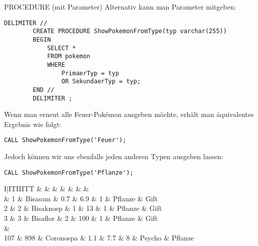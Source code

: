 \begin{sql}{PROCEDURE (mit Parameter)}
    Alternativ kann man Parameter mitgeben:

    \begin{lstlisting}[language=mysql]
        DELIMITER //
        CREATE PROCEDURE ShowPokemonFromType(typ varchar(255))
        BEGIN
            SELECT *
            FROM pokemon
            WHERE
                PrimaerTyp = typ
                OR SekundaerTyp = typ;
        END //
        DELIMITER ;
    \end{lstlisting}

    Wenn man erneut alle Feuer-Pokémon ausgeben möchte, erhält man äquivalentes Ergebnis wie folgt:

    \begin{lstlisting}[language=mysql]
        CALL ShowPokemonFromType('Feuer');
    \end{lstlisting}

    Jedoch können wir uns ebenfalls jeden anderen Typen ausgeben lassen:

    \begin{lstlisting}[language=mysql]
        CALL ShowPokemonFromType('Pflanze');
    \end{lstlisting}

    \begin{tabular}{I|ITIIITT}
                                   &     &  &  &  &  &  &  \\                          & 1                         & Bisasam                  & 0.7                         & 6.9                         & 1                              & Pflanze                        & Gift                             \\
        2                          & 2                         & Bisaknosp                & 1                           & 13                          & 1                              & Pflanze                        & Gift                             \\
        3                          & 3                         & Bisaflor                 & 2                           & 100                         & 1                              & Pflanze                        & Gift                             \\
         &                                                                                                                                                                                              \\
        107                        & 898                       & Coronospa                & 1.1                         & 7.7                         & 8                              & Psycho                         & Pflanze                          \\
    \end{tabular}
    \vspace{1em}


\end{sql}
